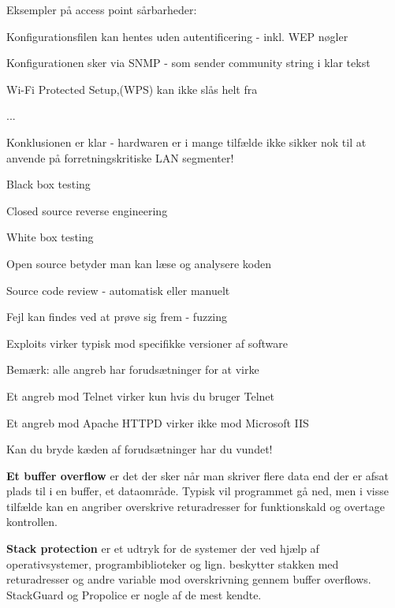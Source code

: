 \documentclass[Screen16to9,17pt]{foils}
\begin{document}
\begin{list1}
\item Eksempler på access point sårbarheder:
\item Konfigurationsfilen kan hentes uden autentificering - inkl. WEP
  nøgler
\item Konfigurationen sker via SNMP - som sender community string i
  klar tekst
\item  Wi-Fi Protected Setup,(WPS) kan ikke slås helt fra
\item ...
\item Konklusionen er klar - hardwaren er i mange tilfælde ikke sikker
  nok til at anvende på forretningskritiske LAN segmenter!
\end{list1}



\begin{list1}
\item Black box testing
\item Closed source reverse engineering
\item White box testing
\item Open source betyder man kan læse og analysere koden
\item Source code review - automatisk eller manuelt
\item Fejl kan findes ved at prøve sig frem - fuzzing
\item Exploits virker typisk mod specifikke versioner af software
\end{list1}

\begin{list1}
\item Bemærk: alle angreb har forudsætninger for at virke
\item Et angreb mod Telnet virker kun hvis du bruger Telnet
\item Et angreb mod Apache HTTPD virker ikke mod Microsoft IIS
\item Kan du bryde kæden af forudsætninger har du vundet!
\end{list1}



\begin{list1}
\item {\bfseries Et buffer overflow}
er det der sker når man skriver flere data end der er afsat plads til
i en buffer, et dataområde. Typisk vil programmet gå ned, men i visse
tilfælde kan en angriber overskrive returadresser for funktionskald og
overtage kontrollen.
\item {\bfseries Stack protection}
er et udtryk for de systemer der ved hjælp af operativsystemer,
programbiblioteker og lign. beskytter stakken med returadresser og
andre variable mod overskrivning gennem buffer overflows. StackGuard
og Propolice er nogle af de mest kendte.
\end{list1}
\end{document}
